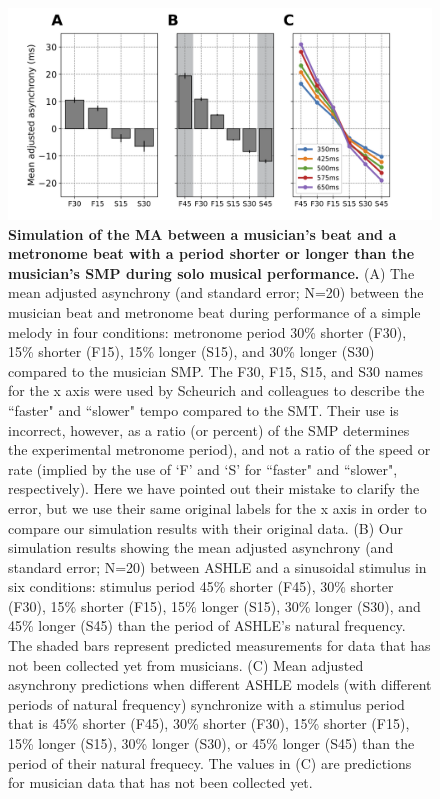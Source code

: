\documentclass{report}
\begin{document}
\begin{figure}
    \centering
    \includegraphics[width=1.0\textwidth]{figures/fig3_2.png}
    \caption[Simulation of the MA between a musician's beat and a metronome beat with a period shorter or longer than the musician's SMP during solo musical performance]{\textbf{Simulation of the MA between a musician's beat and a metronome beat with a period shorter or longer than the musician's SMP during solo musical performance.} (A) The mean adjusted asynchrony (and standard error; N=20) between the musician beat and metronome beat during performance of a simple melody in four conditions: metronome period 30\% shorter (F30), 15\% shorter (F15), 15\% longer (S15), and 30\% longer (S30) compared to the musician SMP. The F30, F15, S15, and S30 names for the x axis were used by Scheurich and colleagues \cite{scheurich2018tapping} to describe the ``faster" and ``slower" tempo compared to the SMT. Their use is incorrect, however, as a ratio (or percent) of the SMP determines the experimental metronome period), and not a ratio of the speed or rate (implied by the use of `F' and `S' for ``faster" and ``slower", respectively). Here we have pointed out their mistake to clarify the error, but we use their same original labels for the x axis in order to compare our simulation results with their original data. (B) Our simulation results showing the mean adjusted asynchrony (and standard error; N=20) between ASHLE and a sinusoidal stimulus in six conditions: stimulus period 45\% shorter (F45), 30\% shorter (F30), 15\% shorter (F15), 15\% longer (S15), 30\% longer (S30), and 45\% longer (S45) than the period of ASHLE's natural frequency. The shaded bars represent predicted measurements for data that has not been collected yet from musicians. (C) Mean adjusted asynchrony predictions when different ASHLE models (with different periods of natural frequency) synchronize with a stimulus period that is 45\% shorter (F45), 30\% shorter (F30), 15\% shorter (F15), 15\% longer (S15), 30\% longer (S30), or 45\% longer (S45) than the period of their natural frequecy. The values in (C) are predictions for musician data that has not been collected yet.}
    \label{f3_2}
\end{figure}
\end{document}
